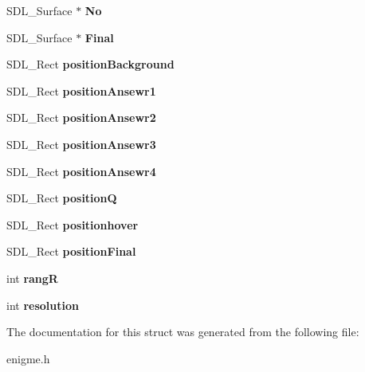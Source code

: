 \begin{DoxyCompactItemize}
S\+D\+L\+\_\+\+Surface $\ast$ {\bfseries No}
\item 
\mbox{\label{structenigme_a38e749d7ae027b8a4b487a49b49fe671}} 
S\+D\+L\+\_\+\+Surface $\ast$ {\bfseries Final}
\item 
\mbox{\label{structenigme_ae0dd357e0952647ab0de64abc803b660}} 
S\+D\+L\+\_\+\+Rect {\bfseries position\+Background}
\item 
\mbox{\label{structenigme_abd09b99260062e8b2f5ec41c9eedbfae}} 
S\+D\+L\+\_\+\+Rect {\bfseries position\+Ansewr1}
\item 
\mbox{\label{structenigme_a64fefb6cab2baaee1c0e54d51f4b5486}} 
S\+D\+L\+\_\+\+Rect {\bfseries position\+Ansewr2}
\item 
\mbox{\label{structenigme_aba195f6df5f2e975e2bb19983f2ae542}} 
S\+D\+L\+\_\+\+Rect {\bfseries position\+Ansewr3}
\item 
\mbox{\label{structenigme_a5b5c3043e61541f4c63c1bc55651ca51}} 
S\+D\+L\+\_\+\+Rect {\bfseries position\+Ansewr4}
\item 
\mbox{\label{structenigme_ae10e2d3b647b0728eba96dcbc3098619}} 
S\+D\+L\+\_\+\+Rect {\bfseries positionQ}
\item 
\mbox{\label{structenigme_acbf34a299f6a43366abb738df85c282d}} 
S\+D\+L\+\_\+\+Rect {\bfseries positionhover}
\item 
\mbox{\label{structenigme_a53787af725dae2956717fa2eba7ca6a9}} 
S\+D\+L\+\_\+\+Rect {\bfseries position\+Final}
\item 
\mbox{\label{structenigme_af7467a612a16fb5cdd6707dd80e52269}} 
int {\bfseries rangR}
\item 
\mbox{\label{structenigme_aecd303e40283cd9e1480aa937104266a}} 
int {\bfseries resolution}
\end{DoxyCompactItemize}


The documentation for this struct was generated from the following file\+:\begin{DoxyCompactItemize}
\item 
enigme.\+h\end{DoxyCompactItemize}
